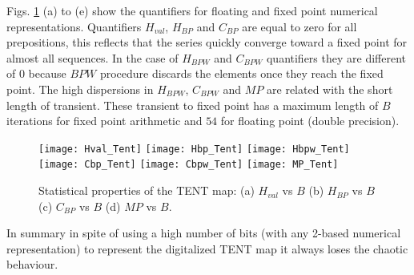 Figs. \ref{fig:TENT_QuantiB} (a) to (e) show the quantifiers for floating and fixed point numerical representations.
Quantifiers $H_{val}$, $H_{BP}$ and $C_{BP}$ are equal to zero for all prepositions, this reflects that the series quickly converge toward a fixed point for almost all sequences.
In the case of $H_{BPW}$ and $C_{BPW}$ quantifiers they are different of $0$ because $BPW$ procedure discards the elements once they reach the fixed point.
The high dispersions in $H_{BPW}$, $C_{BPW}$ and $MP$ are related with the short length of transient.
These transient to fixed point has a maximum length of $B$ iterations for fixed point arithmetic and $54$ for floating point (double precision).

\begin{figure}
	\texttt{[image: Hval\_Tent]}
	\texttt{[image: Hbp\_Tent]}
	\texttt{[image: Hbpw\_Tent]}
	\texttt{[image: Cbp\_Tent]}
	\texttt{[image: Cbpw\_Tent]}
	\texttt{[image: MP\_Tent]}
	\caption{Statistical properties of the TENT map: (a) $H_{val}$ vs $B$ (b) $H_{BP}$ vs $B$ (c) $C_{BP}$ vs $B$ (d) $MP$ vs $B$.}
	\label{fig:TENT_QuantiB}
\end{figure}

In summary in spite of using a high number of bits (with any 2-based numerical representation) to represent the digitalized TENT map it always loses the chaotic behaviour.

